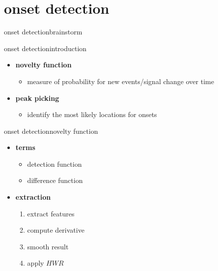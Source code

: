    \section[onsets]{onset detection}
        \begin{frame}{onset detection}{brainstorm}
        \end{frame}
        \begin{frame}{onset detection}{introduction}
            \begin{figure}
                \centering
                
            \end{figure}
            
            \begin{itemize}
                \item<2-> 	\textbf{novelty function}
                    \begin{itemize}
                        \item	measure of probability for new events/signal change over time	
                    \end{itemize}
                
                \item<3->	\textbf{peak picking}
                    \begin{itemize}
                        \item	identify the most likely locations for onsets
                    \end{itemize}
            \end{itemize}
        \end{frame}
        \begin{frame}{onset detection}{novelty function}
            \begin{itemize}
                \item	\textbf{terms}
                    \begin{itemize}
                        \item	detection function
                        \item	difference function
                    \end{itemize}
                \item<2->	\textbf{extraction}
                    \begin{enumerate}
                        \item<2->	extract features
                        \item<3->	compute derivative
                        \item<4->	smooth result
                        \item<5->	apply $HWR$
                    \end{enumerate}
            \end{itemize}
        \end{frame}

